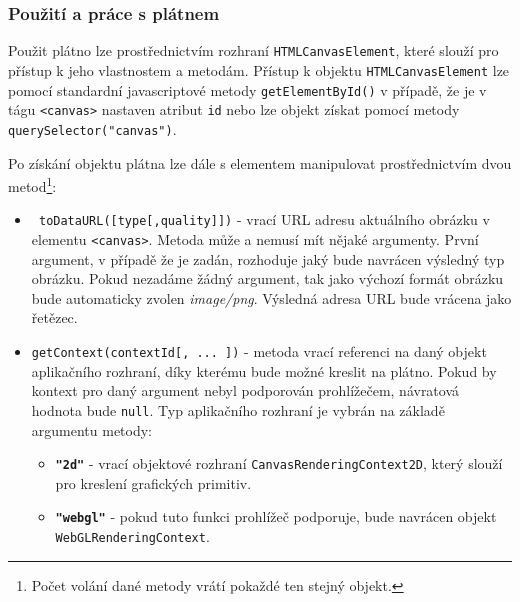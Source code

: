 \subsubsection*{Použití a práce s plátnem}
Použit plátno lze prostřednictvím rozhraní \texttt{HTMLCanvasElement}, které slouží pro přístup k jeho vlastnostem a metodám. Přístup k objektu \texttt{HTMLCanvasElement} lze pomocí standardní javascriptové metody \texttt{getElementById()} v případě, že je v tágu \texttt{<canvas>} nastaven atribut \texttt{id} nebo lze objekt získat pomocí metody \texttt{querySelector("canvas")}.

Po získání objektu plátna lze dále s elementem manipulovat prostřednictvím dvou metod\footnote{Počet volání dané metody vrátí pokaždé ten stejný objekt.}:
	 	\begin{itemize}		
			\item \texttt{ toDataURL([type[,quality]])} \newline
			 - vrací URL adresu aktuálního obrázku v elementu \texttt{<canvas>}. Metoda může a nemusí mít nějaké argumenty. První argument, v případě že je zadán, rozhoduje jaký bude navrácen výsledný typ obrázku. Pokud nezadáme žádný argument, tak jako výchozí formát obrázku bude automaticky zvolen \textit{image/png}. Výsledná adresa URL bude vrácena jako řetězec. \cite{html5}
			
			\item \texttt{getContext(contextId[, ... ])}\newline
			 - metoda vrací referenci na daný objekt aplikačního rozhraní, díky kterému bude možné kreslit na plátno. Pokud by kontext pro daný argument nebyl podporován prohlížečem, návratová hodnota bude \texttt{null}. Typ aplikačního rozhraní je vybrán na základě argumentu metody:
			 \begin{itemize}
			 	\item  \texttt{\textbf{"2d"}} - vrací objektové rozhraní \texttt{CanvasRenderingContext2D}, který slouží pro kreslení grafických primitiv.
			 	
			 	\item \texttt{\textbf{"webgl"}} - pokud tuto funkci prohlížeč podporuje, bude navrácen objekt \newline \texttt{WebGLRenderingContext}. \cite{html5} 
			 \end{itemize}
		 
 
		\end{itemize}

\newpage


